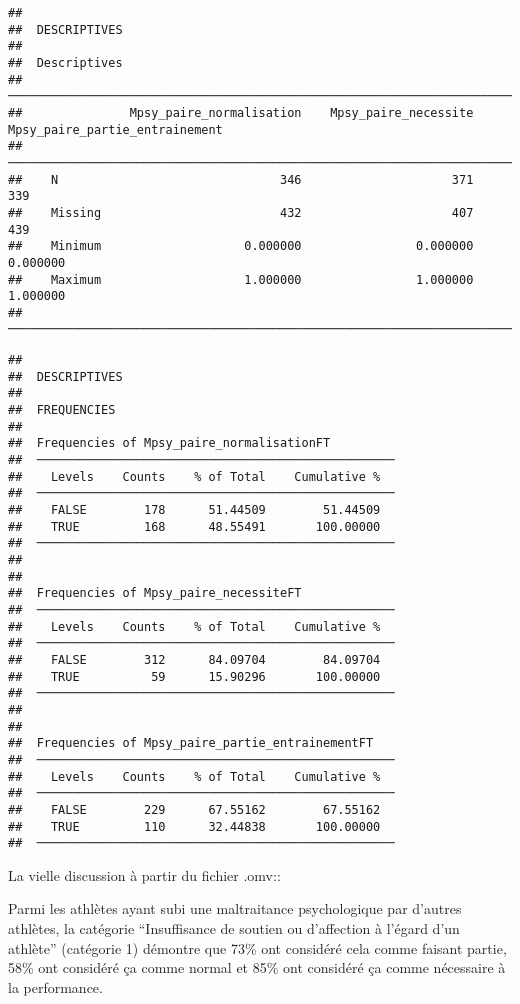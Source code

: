 \documentclass[
]{article}
\begin{document}
\begin{verbatim}
## 
##  DESCRIPTIVES
## 
##  Descriptives                                                                                      
##  ───────────────────────────────────────────────────────────────────────────────────────────────── 
##               Mpsy_paire_normalisation    Mpsy_paire_necessite    Mpsy_paire_partie_entrainement   
##  ───────────────────────────────────────────────────────────────────────────────────────────────── 
##    N                               346                     371                               339   
##    Missing                         432                     407                               439   
##    Minimum                    0.000000                0.000000                          0.000000   
##    Maximum                    1.000000                1.000000                          1.000000   
##  ─────────────────────────────────────────────────────────────────────────────────────────────────
\end{verbatim}

\begin{verbatim}
## 
##  DESCRIPTIVES
## 
##  FREQUENCIES
## 
##  Frequencies of Mpsy_paire_normalisationFT          
##  ────────────────────────────────────────────────── 
##    Levels    Counts    % of Total    Cumulative %   
##  ────────────────────────────────────────────────── 
##    FALSE        178      51.44509        51.44509   
##    TRUE         168      48.55491       100.00000   
##  ────────────────────────────────────────────────── 
## 
## 
##  Frequencies of Mpsy_paire_necessiteFT              
##  ────────────────────────────────────────────────── 
##    Levels    Counts    % of Total    Cumulative %   
##  ────────────────────────────────────────────────── 
##    FALSE        312      84.09704        84.09704   
##    TRUE          59      15.90296       100.00000   
##  ────────────────────────────────────────────────── 
## 
## 
##  Frequencies of Mpsy_paire_partie_entrainementFT    
##  ────────────────────────────────────────────────── 
##    Levels    Counts    % of Total    Cumulative %   
##  ────────────────────────────────────────────────── 
##    FALSE        229      67.55162        67.55162   
##    TRUE         110      32.44838       100.00000   
##  ──────────────────────────────────────────────────
\end{verbatim}

La vielle discussion à partir du fichier .omv::

Parmi les athlètes ayant subi une maltraitance psychologique par
d'autres athlètes, la catégorie ``Insuffisance de soutien ou d'affection
à l'égard d'un athlète'' (catégorie 1) démontre que 73\% ont considéré
cela comme faisant partie, 58\% ont considéré ça comme normal et 85\%
ont considéré ça comme nécessaire à la performance.
\end{document}
